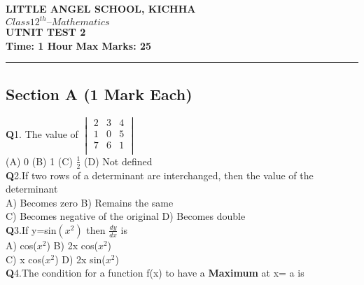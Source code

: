 \documentclass{article}
\newcommand{\q}{\textbf{Q}}
\begin{document}
\begin{center}
    \LARGE \textbf{LITTLE ANGEL SCHOOL, KICHHA} \\[0.5em]
    \Large \textbf{$Class 12^{th} – Mathematics$} \\[0.25em]
    \normalsize \textbf{UTNIT TEST 2} \\[1em]
    \textbf{Time: 1 Hour} \hspace{3 cm} \textbf{Max Marks: 25} \\
    \rule{\textwidth}{0.5 pt}  %
\end{center}
\vspace{1 em}
\begin{center}
   \section*{Section A (1 Mark Each)} 
\end{center}
\q1. The value of
$\begin{vmatrix}
  2 & 3 & 4 \\
  1 & 0 & 5 \\
  7 & 6 & 1 \\
\end{vmatrix}$ \\
(A) 0 \hspace{1 cm}
(B) 1 \hspace{1 cm}
(C) \(\frac{1}{2}\) \hspace{1 cm}
(D) Not defined
\vspace{1 em}\\
\q2.If two rows of a determinant are interchanged, then the value of the determinant  \\
A) Becomes zero \hspace{4.9 cm}
B) Remains the same \hspace{2 cm}\\
C) Becomes negative of the original \hspace{2 cm}
D) Becomes double \vspace{1 em}\\
\q3.If y=sin$(x^2)$ then $\frac{dy}{dx}$ is \\
A) cos($x^2$) \hspace{5.3 cm}
B) 2x cos($x^2$)\\
C) x cos($x^2$) \hspace{5 cm}
D) 2x sin($x^2$) \vspace{1 em}\\
\q4.The condition for a function f(x) to have a \textbf{Maximum} at x= a is \\ 
\end{document}
